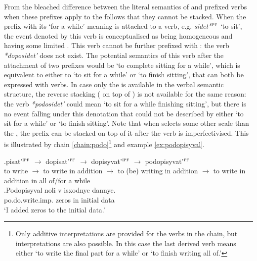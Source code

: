 From the bleached difference between the literal semantics of  and prefixed verbs when these prefixes apply to the  follows that they cannot be stacked. When the prefix  with its `for a while' meaning is attached to a verb, e.g. \textit{sidet'}$^{\textsc{ipf}}$ `to sit', the event denoted by this verb is conceptualised as being homogeneous and having some limited . This verb cannot be further prefixed with : the verb \textit{*doposidet'} does not exist. The potential semantics of this verb after the attachment of two prefixes would be `to complete sitting for a while', which is equivalent to either to `to sit for a while' or `to finish sitting', that can both be expressed with  verbs. In case only the  is available in the verbal semantic structure, the reverse stacking ( on top of ) is not available for the same reason: the verb \textit{*podosidet'} could mean `to sit for a while finishing sitting', but there is no event falling under this denotation that could not be described by either `to sit for a while' or `to finish sitting'. Note that when  selects some other scale than the , the prefix  can be stacked on top of it after the verb is imperfectivised. This is illustrated by chain \ref{chain:podo}\footnote{Only additive interpretations are provided for the verbs in the chain, but  interpretations are also possible. In this case the last derived verb means either `to write the final part for a while' or `to finish writing all of.'} and example \ref{ex:podopisyval}.

\exg.\label{chain:podo}pisat'$^{\textsc{ipf}}$ $\rightarrow$ dopisat'$^{\textsc{pf}}$ $\rightarrow$ dopisyvat'$^{\textsc{ipf}}$ $\rightarrow$ podopisyvat'$^{\textsc{pf}}$\\
{to write} $\rightarrow$ {to write in addition} $\rightarrow$ {to (be) writing in addition} $\rightarrow$ {to write in addition in all of/for a while}\\

\exg.\label{ex:podopisyval}Podopisyval noli v isxodnye dannye.\\
po.do.write.imp. zeros in initial data\\
\trans `I added zeros to the initial data.'

